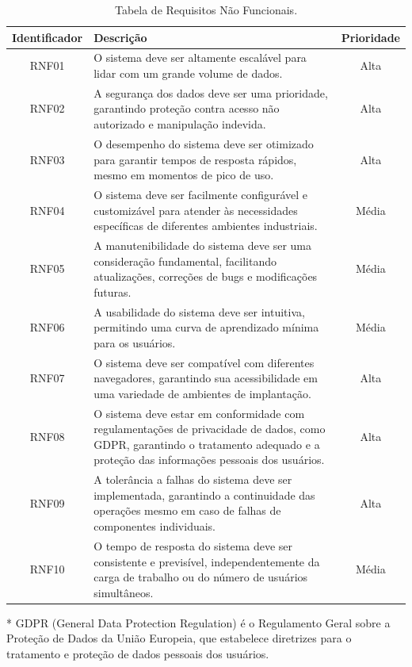 \begin{table}[htbp]
\centering
\begin{threeparttable}
\begin{tabularx}{\linewidth}{|c|X|c|} \hline
\rowcolor[HTML]{C0C0C0} 
    \textbf{Identificador} & \textbf{Descrição} & \textbf{Prioridade} \\
    \hline
    RNF01 & O sistema deve ser altamente escalável para lidar com um grande volume de dados. & Alta \\
    \hline
    RNF02 & A segurança dos dados deve ser uma prioridade, garantindo proteção contra acesso não autorizado e manipulação indevida. & Alta \\
    \hline
    RNF03 & O desempenho do sistema deve ser otimizado para garantir tempos de resposta rápidos, mesmo em momentos de pico de uso. & Alta \\
    \hline
    RNF04 & O sistema deve ser facilmente configurável e customizável para atender às necessidades específicas de diferentes ambientes industriais. & Média \\
    \hline
    RNF05 & A manutenibilidade do sistema deve ser uma consideração fundamental, facilitando atualizações, correções de bugs e modificações futuras. & Média \\
    \hline
    RNF06 & A usabilidade do sistema deve ser intuitiva, permitindo uma curva de aprendizado mínima para os usuários. & Média \\
    \hline
    RNF07 & O sistema deve ser compatível com diferentes navegadores, garantindo sua acessibilidade em uma variedade de ambientes de implantação. & Alta \\
    \hline
    RNF08 & O sistema deve estar em conformidade com regulamentações de privacidade de dados, como GDPR\tnote{*}, garantindo o tratamento adequado e a proteção das informações pessoais dos usuários. & Alta \\
    \hline
    RNF09 & A tolerância a falhas do sistema deve ser implementada, garantindo a continuidade das operações mesmo em caso de falhas de componentes individuais. & Alta \\
    \hline
    RNF10 & O tempo de resposta do sistema deve ser consistente e previsível, independentemente da carga de trabalho ou do número de usuários simultâneos. & Média \\
    \hline
\end{tabularx}
\begin{tablenotes}
    \footnotesize
    \item[*] GDPR (General Data Protection Regulation) é o Regulamento Geral sobre a Proteção de Dados da União Europeia, que estabelece diretrizes para o tratamento e proteção de dados pessoais dos usuários.
\end{tablenotes}
\end{threeparttable}
\caption{Tabela de Requisitos Não Funcionais.}
\label{tab:ReqNaoFuncional}
\end{table}

